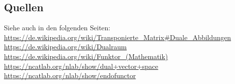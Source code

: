 \documentclass[a4paper]{amsart}
\theoremstyle{definition}
\begin{document}
\subsection*{Quellen}
Siehe auch in den folgenden Seiten:\\
\url{https://de.wikipedia.org/wiki/Transponierte_Matrix#Duale_Abbildungen}\\
\url{https://de.wikipedia.org/wiki/Dualraum}\\
\url{https://de.wikipedia.org/wiki/Funktor_(Mathematik)}\\
\url{https://ncatlab.org/nlab/show/dual+vector+space}\\
\url{https://ncatlab.org/nlab/show/endofunctor}\\

\end{document}
